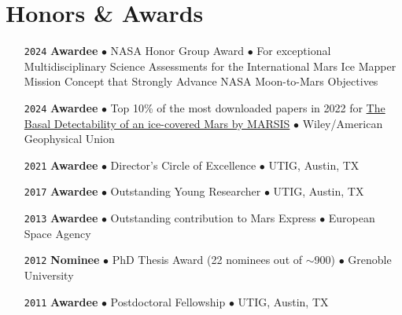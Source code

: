 \section*{Honors \& Awards}

\begin{itemize}[leftmargin=3.8em, labelsep=1.5em]
    \setlength\itemsep{-.5em}
    \item[\texttt{2024}] \textbf{Awardee} $\bullet$ NASA Honor Group Award $\bullet$ For exceptional Multidisciplinary Science Assessments for the International Mars Ice Mapper Mission Concept that Strongly Advance NASA Moon-to-Mars Objectives
    \item[\texttt{2024}] \textbf{Awardee} $\bullet$ Top 10\% of the most downloaded papers in 2022 for \href{https://doi.org/10.1029/2021GL096518}{The Basal Detectability of an ice-covered Mars by MARSIS} $\bullet$ Wiley/American Geophysical Union
    \item[\texttt{2021}] \textbf{Awardee} $\bullet$ Director's Circle of Excellence $\bullet$ UTIG, Austin, TX
    \item[\texttt{2017}] \textbf{Awardee} $\bullet$ Outstanding Young Researcher $\bullet$ UTIG, Austin, TX
    \item[\texttt{2013}] \textbf{Awardee} $\bullet$ Outstanding contribution to Mars Express $\bullet$ European Space Agency
    \item[\texttt{2012}] \textbf{Nominee} $\bullet$ PhD Thesis Award (22 nominees out of $\sim$900) $\bullet$ Grenoble University
    \item[\texttt{2011}] \textbf{Awardee} $\bullet$ Postdoctoral Fellowship $\bullet$ UTIG, Austin, TX
    

\end{itemize}
